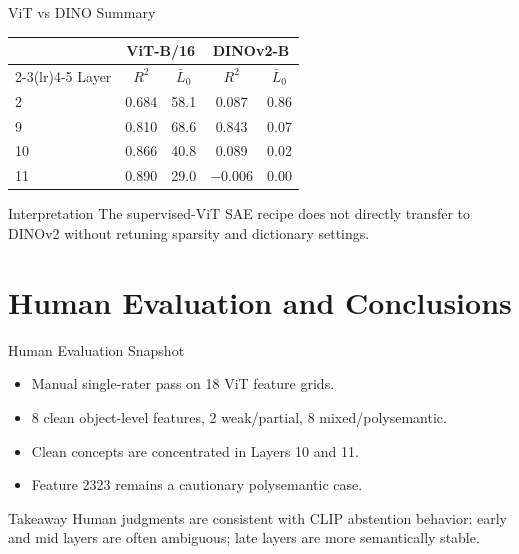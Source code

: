 \documentclass[aspectratio=169,t,xcolor=table]{beamer}
\begin{document}
\begin{frame}{ViT vs DINO Summary}
\small
\centering
\begin{tabular}{lcccc}
\toprule
 & \multicolumn{2}{c}{ViT-B/16} & \multicolumn{2}{c}{DINOv2-B} \\
\cmidrule(lr){2-3}\cmidrule(lr){4-5}
Layer & $R^2$ & $\bar{L}_0$ & $R^2$ & $\bar{L}_0$ \\
\midrule
2  & 0.684 & 58.1 & 0.087  & 0.86 \\
9  & 0.810 & 68.6 & 0.843  & 0.07 \\
10 & 0.866 & 40.8 & 0.089  & 0.02 \\
11 & 0.890 & 29.0 & $-0.006$ & 0.00 \\
\bottomrule
\end{tabular}

\vspace{0.4em}
\begin{block}{Interpretation}
The supervised-ViT SAE recipe does not directly transfer to DINOv2 without retuning sparsity and dictionary settings.
\end{block}
\end{frame}

\section{Human Evaluation and Conclusions}

\begin{frame}{Human Evaluation Snapshot}
\begin{itemize}
    \item Manual single-rater pass on 18 ViT feature grids.
    \item 8 clean object-level features, 2 weak/partial, 8 mixed/polysemantic.
    \item Clean concepts are concentrated in Layers 10 and 11.
    \item Feature 2323 remains a cautionary polysemantic case.
\end{itemize}

\vspace{0.4em}
\begin{block}{Takeaway}
Human judgments are consistent with CLIP abstention behavior: early and mid layers are often ambiguous; late layers are more semantically stable.
\end{block}
\end{frame}
\end{document}
